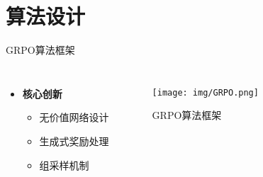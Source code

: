         

\section{算法设计}

\begin{frame}{GRPO算法框架}
    \begin{columns}
        \begin{itemize}
            \item \textbf{核心创新}
            \begin{itemize}
                \item 无价值网络设计
                \item 生成式奖励处理
                \item 组采样机制
            \end{itemize}
        \end{itemize}
        \begin{figure}
            \texttt{[image: img/GRPO.png]}
            \caption{GRPO算法框架}
        \end{figure}
    \end{columns}
\end{frame}

